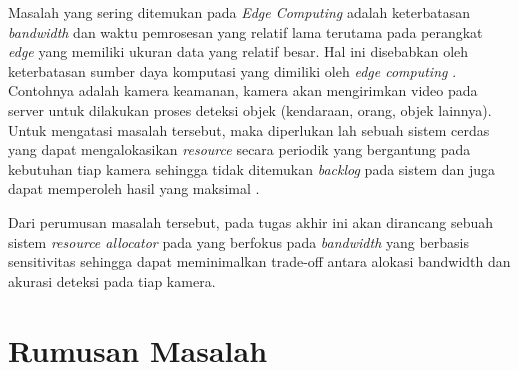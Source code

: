 Masalah yang sering ditemukan pada \textit{Edge Computing} adalah keterbatasan \textit{bandwidth} dan waktu pemrosesan yang relatif lama terutama pada perangkat \textit{edge} yang memiliki ukuran data yang relatif besar. 
Hal ini disebabkan oleh keterbatasan sumber daya komputasi yang dimiliki oleh \textit{edge computing} \citep{edgeCompDis}. Contohnya adalah kamera keamanan, kamera akan mengirimkan video pada server untuk dilakukan proses deteksi objek (kendaraan, orang, objek lainnya). 
Untuk mengatasi masalah tersebut, maka diperlukan lah sebuah sistem cerdas yang dapat mengalokasikan \textit{resource} secara periodik yang bergantung pada kebutuhan tiap kamera sehingga
tidak ditemukan \textit{backlog} pada sistem dan juga dapat memperoleh hasil yang maksimal \citep{edgeComp2}.

Dari perumusan masalah tersebut, pada tugas akhir ini akan dirancang sebuah sistem \textit{resource allocator} pada yang berfokus pada \textit{bandwidth} yang berbasis
sensitivitas sehingga dapat meminimalkan trade-off antara alokasi bandwidth dan akurasi deteksi pada tiap kamera. 


\section{Rumusan Masalah}




